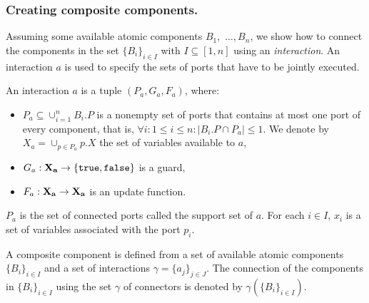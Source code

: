 \subsubsection{Creating composite components.} Assuming some available atomic components $B_1,$ $\ldots,B_n$, we show how to connect the components in the set $\{B_i\}_{i\in I}$ with $I\subseteq [1,n]$ using an \emph{interaction}. An interaction $a$ is used to specify the sets of ports that have to be jointly executed.


\begin{definition}[Interaction]
\label{def:connector}
An interaction $a$ is a tuple $(P_a, G_a,F_a)$, where:
\begin{itemize}
\item $P_a \subseteq \cup_{i = 1} ^ { n } B_i.P$ is a nonempty set of ports that contains
at most one port of every component, that is, $\forall i: 1 \leq i \leq n: |B_i.P \cap P_a| \leq 1 $. We denote by $X_a = \cup_{p \in P_a} p.X$ the set of variables available to $a$,
\item $G_a : \mathbf{X_a} \rightarrow \{\mathtt{true}, \mathtt{false}\}$ is a guard, 
\item $F_a : \mathbf{X_a} \rightarrow \mathbf{X_a}$ is an update function. 
\end{itemize}
\end{definition}
%
$P_a$ is the set of connected ports called the support set of $a$. For each $i\in I$, $x_i$ is a set of variables associated with the port $p_i$.


%
\begin{definition}
  A composite component is defined from a set of available atomic components $\{B_i\}_{i\in I}$ and a set of interactions $\gamma=\{a_j\}_{j\in J}$.
The connection of the components in $\{B_i\}_{i\in I}$ using the set $\gamma$ of connectors is denoted by $\gamma(\{B_{i}\}_{i\in I})$.
\end{definition}

